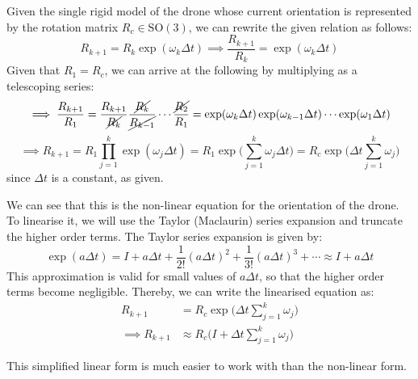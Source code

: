 Given the single rigid model of the drone whose current orientation is represented by the rotation matrix \( R_c \in \text{SO}(3) \), we can rewrite the given relation as follows:
\begin{equation*}
    R_{k+1}
    =
    R_k \exp(\omega_k \Delta t)
    \implies
    \frac{R_{k+1}}{R_k}
    =
    \exp(\omega_k \Delta t)
\end{equation*}
Given that \( R_{1} = R_c \), we can arrive at the following by multiplying as a telescoping series:
\begin{equation*}
    \implies
    \frac{R_{k+1}}{R_1}
    =
    \frac{R_{k+1}}{\cancel{R_k}}
    \frac{\cancel{R_k}}{\cancel{R_{k-1}}}
    \cdots
    \frac{\cancel{R_2}}{R_1}
    =
    \exp(\omega_k \Delta t)
    \exp(\omega_{k-1} \Delta t)
    \cdots
    \exp(\omega_1 \Delta t)
\end{equation*}
\begin{equation*}
    \implies
    R_{k+1}
    =
    R_1 \prod_{j=1}^{k} \exp(\omega_j \Delta t)
    =
    R_1 \exp \Big( \sum_{j=1}^{k} \omega_j \Delta t \Big)
    =
    R_c \exp \Big( \Delta t \sum_{j=1}^{k} \omega_j \Big)
\end{equation*}
since \( \Delta t \) is a constant, as given.

We can see that this is the non-linear equation for the orientation of the drone.
To linearise it, we will use the Taylor (Maclaurin) series expansion and truncate the higher order terms.
The Taylor series expansion is given by:
\begin{equation*}
    \exp(a \Delta t)
    =
    I + a \Delta t + \frac{1}{2!} (a \Delta t)^2 + \frac{1}{3!} (a \Delta t)^3 + \cdots
    \approx
    I + a \Delta t
\end{equation*}
This approximation is valid for small values of \( a \Delta t \), so that the higher order terms become negligible.
Thereby, we can write the linearised equation as:
\begin{align*}
    R_{k+1}
     & =
    R_c \exp \Big( \Delta t \sum_{j=1}^{k} \omega_j \Big)
    \\
    \implies
    R_{k+1}
     & \approx
    R_c \Big( I + \Delta t \sum_{j=1}^{k} \omega_j \Big)
\end{align*}

This simplified linear form is much easier to work with than the non-linear form.
